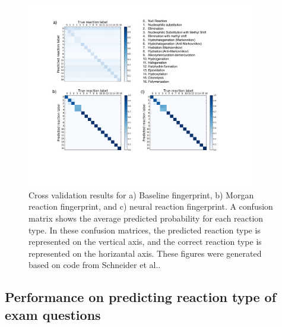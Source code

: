 \begin{figure}[ht!]
\begin{center}
\includegraphics[trim=80 180 80 70,clip,width=0.9\textwidth]{confmat}
\caption{\label{fig:conf_mat} Cross validation results for a) Baseline fingerprint, b) Morgan reaction fingerprint, and c) neural reaction fingerprint. A confusion matrix shows the average predicted probability for each reaction type. In these confusion matrices, the predicted reaction type is represented on the vertical axis, and the correct reaction type is represented on the horizantal axis. These figures were generated based on code from Schneider et al.\cite{Schneider_2015}.
}
\end{center}
\end{figure}

\subsection{Performance on predicting reaction type of exam questions}

